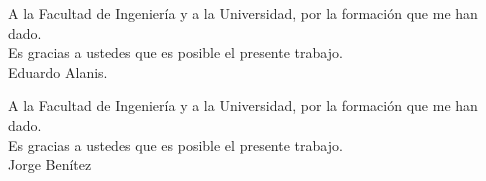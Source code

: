 \begin{dedication}
A la Facultad de Ingeniería y a la  Universidad, por la formación que me han dado.\\
Es gracias a ustedes que es posible el presente trabajo.\\

Eduardo Alanis.
\bigskip

A la Facultad de Ingeniería y a la  Universidad, por la formación que me han dado.\\
Es gracias a ustedes que es posible el presente trabajo.\\

Jorge Benítez
\end{dedication}
